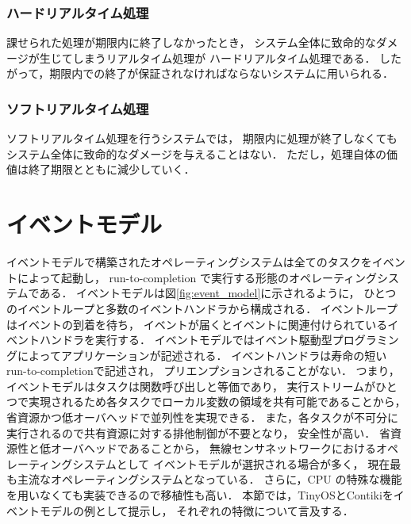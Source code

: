 \subsubsection{ハードリアルタイム処理}

\vspace{0.5em}課せられた処理が期限内に終了しなかったとき，
システム全体に致命的なダメージが生じてしまうリアルタイム処理が
ハードリアルタイム処理である．
したがって，期限内での終了が保証されなければならないシステムに用いられる．

\subsubsection{ソフトリアルタイム処理}

\vspace{0.5em}ソフトリアルタイム処理を行うシステムでは，
期限内に処理が終了しなくてもシステム全体に致命的なダメージを与えることはない．
ただし，処理自体の価値は終了期限とともに減少していく．






\section{イベントモデル}\label{sec:event_model}
イベントモデルで構築されたオペレーティングシステムは全てのタスクをイベントによって起動し，
run-to-completion で実行する形態のオペレーティングシステムである．
イベントモデルは図\ref{fig:event_model}に示されるように，
ひとつのイベントループと多数のイベントハンドラから構成される．
イベントループはイベントの到着を待ち，
イベントが届くとイベントに関連付けられているイベントハンドラを実行する．
イベントモデルではイベント駆動型プログラミングによってアプリケーションが記述される．
イベントハンドラは寿命の短いrun-to-completionで記述され，
プリエンプションされることがない．
つまり，イベントモデルはタスクは関数呼び出しと等価であり，
実行ストリームがひとつで実現されるため各タスクでローカル変数の領域を共有可能であることから，
省資源かつ低オーバヘッドで並列性を実現できる．
また，各タスクが不可分に実行されるので共有資源に対する排他制御が不要となり，
安全性が高い．
省資源性と低オーバヘッドであることから，
無線センサネットワークにおけるオペレーティングシステムとして
イベントモデルが選択される場合が多く，
現在最も主流なオペレーティングシステムとなっている．
さらに，CPU の特殊な機能を用いなくても実装できるので移植性も高い．
本節では，TinyOSとContikiをイベントモデルの例として提示し，
それぞれの特徴について言及する．



